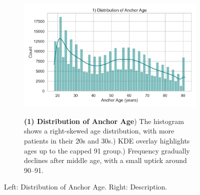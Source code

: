 \begin{figure}[ht!]
    \centering
    \begin{subfigure}{0.42\textwidth}
        \includegraphics[width=\linewidth]{mimic_plots/plot1.jpg}
    \end{subfigure}\hfill
    \begin{subfigure}{0.54\textwidth}
        \footnotesize
        \textbf{(1) Distribution of Anchor Age}) The histogram shows a right-skewed age distribution, with more patients in their 20s and 30s.) KDE overlay highlights ages up to the capped 91 group.) Frequency gradually declines after middle age, with a small uptick around 90--91.
    \end{subfigure}
    \caption{Left: Distribution of Anchor Age. Right: Description.}
    \label{fig:plot1}
\end{figure}


